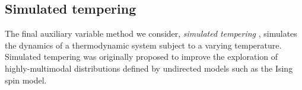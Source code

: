 





\subsection{Simulated tempering}\label{subsec:simulated-tempering}

The final auxiliary variable method we consider, \emph{simulated tempering} \citep{marinari1992simulated}, simulates the dynamics of a thermodynamic system subject to a varying temperature. Simulated tempering was originally proposed to improve the exploration of highly-multimodal distributions defined by undirected models such as the Ising spin model. 


